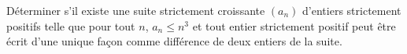 Déterminer s'il existe une suite strictement croissante $(a_n)$ d'entiers strictement positifs telle que pour tout $n$, $a_n\le n^3$ et tout entier strictement positif peut être écrit d'une unique façon comme différence de deux entiers de la suite.
